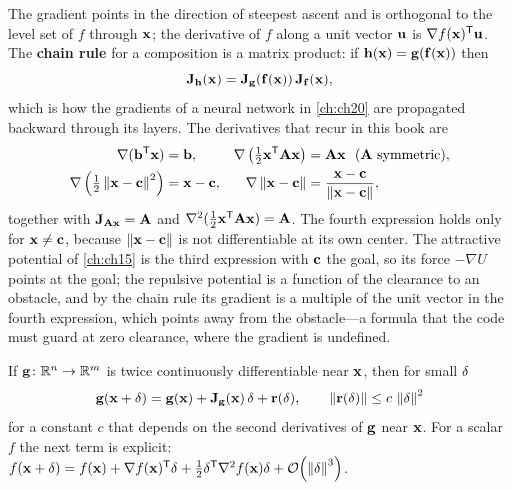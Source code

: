 The gradient points in the direction of steepest ascent and is orthogonal to
the level set of $f$ through $\mathbf{x}$; the derivative of $f$ along a unit
vector $\mathbf{u}$ is $\nabla f(\mathbf{x})^{\mathsf{T}}\mathbf{u}$. The \textbf{chain
rule} for a composition is a matrix product: if
$\mathbf{h}(\mathbf{x}) = \mathbf{g}(\mathbf{f}(\mathbf{x}))$ then
\begin{equation}
  \mathbf{J}_{\mathbf{h}}(\mathbf{x}) = \mathbf{J}_{\mathbf{g}}(\mathbf{f}(\mathbf{x}))\,\mathbf{J}_{\mathbf{f}}(\mathbf{x}),
  \label{eq:appB-chain}
\end{equation}
which is how the gradients of a neural network in \cref{ch:ch20} are
propagated backward through its layers. The derivatives that recur in this
book are
\begin{equation}
  \begin{aligned}
  \nabla(\mathbf{b}^{\mathsf{T}}\mathbf{x}) &= \mathbf{b}, &
  \nabla\left(\tfrac12\mathbf{x}^{\mathsf{T}}\mathbf{A}\mathbf{x}\right) &= \mathbf{A}\mathbf{x}\ \ (\mathbf{A} \text{ symmetric}),\\
  \nabla\left(\tfrac12\left\lVert \mathbf{x} - \mathbf{c} \right\rVert^2\right) &= \mathbf{x} - \mathbf{c}, &
  \nabla\left\lVert \mathbf{x} - \mathbf{c} \right\rVert &= \frac{\mathbf{x} - \mathbf{c}}{\left\lVert \mathbf{x} - \mathbf{c} \right\rVert},
  \end{aligned}
  \label{eq:appB-derivs}
\end{equation}
together with $\mathbf{J}_{\mathbf{A}\mathbf{x}} = \mathbf{A}$ and
$\nabla^2(\tfrac12\mathbf{x}^{\mathsf{T}}\mathbf{A}\mathbf{x}) = \mathbf{A}$. The fourth expression
holds only for $\mathbf{x} \ne \mathbf{c}$, because $\left\lVert \mathbf{x} - \mathbf{c} \right\rVert$ is
not differentiable at its own center. The attractive
potential of \cref{ch:ch15} is the third expression with $\mathbf{c}$ the goal,
so its force $-\nabla U$ points at the goal; the repulsive potential is a
function of the clearance to an obstacle, and by the chain rule its gradient
is a multiple of the unit vector in the fourth expression, which points away
from the obstacle---a formula that the code must guard at zero clearance,
where the gradient is undefined.

\begin{proposition}
\label{thm:appB-taylor}
If $\mathbf{g}\colon \mathbb{R}^n \to \mathbb{R}^m$ is twice continuously differentiable near $\mathbf{x}$, then for small $\mathbf{\delta}$
\begin{equation}
  \mathbf{g}(\mathbf{x} + \mathbf{\delta}) = \mathbf{g}(\mathbf{x}) + \mathbf{J}_{\mathbf{g}}(\mathbf{x})\,\mathbf{\delta} + \mathbf{r}(\mathbf{\delta}),\qquad \left\lVert \mathbf{r}(\mathbf{\delta}) \right\rVert \le c\,\left\lVert \mathbf{\delta} \right\rVert^2
  \label{eq:appB-taylor1}
\end{equation}
for a constant $c$ that depends on the second derivatives of $\mathbf{g}$ near $\mathbf{x}$. For a scalar $f$ the next term is explicit: $f(\mathbf{x} + \mathbf{\delta}) = f(\mathbf{x}) + \nabla f(\mathbf{x})^{\mathsf{T}}\mathbf{\delta} + \tfrac12\mathbf{\delta}^{\mathsf{T}}\nabla^2 f(\mathbf{x})\mathbf{\delta} + \mathcal{O}\!\left(\left\lVert \mathbf{\delta} \right\rVert^3\right)$.
\end{proposition}

